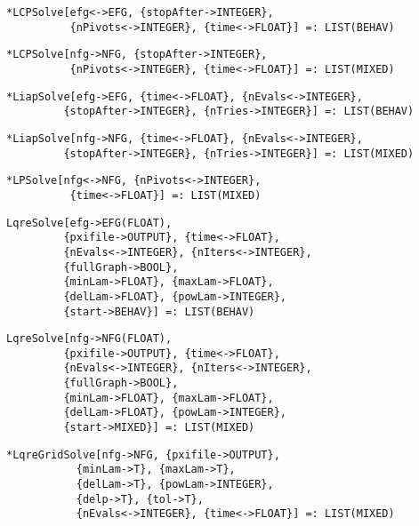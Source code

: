 \protect \large \begin{verbatim}
*LCPSolve[efg<->EFG, {stopAfter->INTEGER},
          {nPivots<->INTEGER}, {time<->FLOAT}] =: LIST(BEHAV)
\end{verbatim}\normalsize

\protect \large \begin{verbatim}
*LCPSolve[nfg->NFG, {stopAfter->INTEGER},
          {nPivots<->INTEGER}, {time<->FLOAT}] =: LIST(MIXED)
\end{verbatim}\normalsize

\protect \large \begin{verbatim}
*LiapSolve[efg->EFG, {time<->FLOAT}, {nEvals<->INTEGER},
         {stopAfter->INTEGER}, {nTries->INTEGER}] =: LIST(BEHAV)
\end{verbatim}\normalsize

\protect \large \begin{verbatim}
*LiapSolve[nfg->NFG, {time<->FLOAT}, {nEvals<->INTEGER},
         {stopAfter->INTEGER}, {nTries->INTEGER}] =: LIST(MIXED)
\end{verbatim}\normalsize

\protect \large \begin{verbatim}
*LPSolve[nfg<->NFG, {nPivots<->INTEGER},
          {time<->FLOAT}] =: LIST(MIXED)
\end{verbatim}\normalsize
 
\protect \large \begin{verbatim}
LqreSolve[efg->EFG(FLOAT),
         {pxifile->OUTPUT}, {time<->FLOAT},
         {nEvals<->INTEGER}, {nIters<->INTEGER},
         {fullGraph->BOOL},
         {minLam->FLOAT}, {maxLam->FLOAT}, 
         {delLam->FLOAT}, {powLam->INTEGER}, 
         {start->BEHAV}] =: LIST(BEHAV)
\end{verbatim}\normalsize

\protect \large \begin{verbatim}
LqreSolve[nfg->NFG(FLOAT),
         {pxifile->OUTPUT}, {time<->FLOAT},
         {nEvals<->INTEGER}, {nIters<->INTEGER},
         {fullGraph->BOOL},
         {minLam->FLOAT}, {maxLam->FLOAT}, 
         {delLam->FLOAT}, {powLam->INTEGER}, 
         {start->MIXED}] =: LIST(MIXED)
\end{verbatim}\normalsize

\protect \large \begin{verbatim}
*LqreGridSolve[nfg->NFG, {pxifile->OUTPUT},
           {minLam->T}, {maxLam->T}, 
           {delLam->T}, {powLam->INTEGER}, 
           {delp->T}, {tol->T},
           {nEvals<->INTEGER}, {time<->FLOAT}] =: LIST(MIXED)
\end{verbatim}\normalsize

